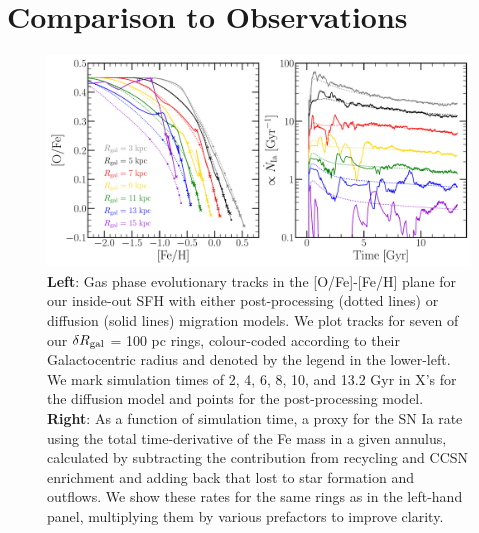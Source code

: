 \documentclass[draft2.tex]{subfiles}
\begin{document}
 

\section{Comparison to Observations} 
\label{sec:obs_comp} 

\begin{figure} 
\centering 
\includegraphics[scale = 0.42]{tracks.pdf} 
\caption{\textbf{Left}: Gas phase evolutionary tracks in the [O/Fe]-[Fe/H] 
plane for our inside-out SFH with either post-processing (dotted lines) or 
diffusion (solid lines) migration models. We plot tracks for seven of our 
$\delta R_\text{gal}$ = 100 pc rings, 
colour-coded according to their Galactocentric radius and denoted by the 
legend in the lower-left. We mark simulation times of 2, 4, 6, 8, 10, and 13.2 
Gyr in X's for the diffusion model and points for the post-processing model. 
\textbf{Right}: As a function of simulation time, a proxy for the SN Ia rate 
using the total time-derivative of the Fe mass in a given annulus, calculated 
by subtracting the contribution from recycling and CCSN enrichment and adding 
back that lost to star formation and outflows. We show these rates for the 
same rings as in the left-hand panel, multiplying them by various prefactors 
to improve clarity. } 
\label{fig:tracks} 
\end{figure} 
\end{document}
